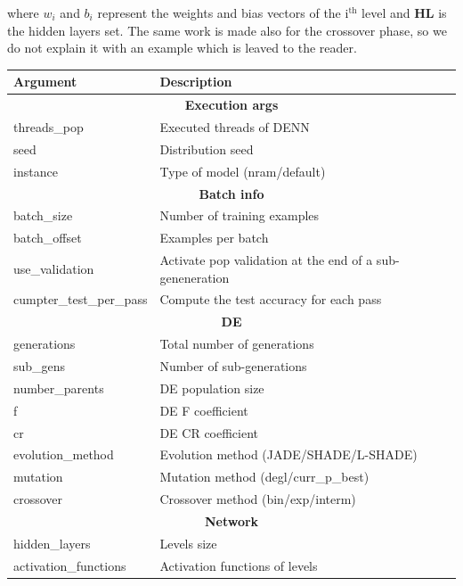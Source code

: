 where $w_i$ and $b_i$ represent the weights and bias vectors of the $\textrm{i}^{\textrm{th}}$ level and \textbf{HL} is the hidden layers set. The same work is made also for the crossover phase, so we do not explain it with an example which is leaved to the reader.

\begin{table}[]
	\centering
	\begin{tabular}{|l|l|}
		\hline
		Argument     & Description \\ \hline \hline

		\multicolumn{2}{|c|}{\textbf{Execution args}} \\ \hline
		threads\_pop & Executed threads of DENN \\ \hline
		seed     	 & Distribution seed \\ \hline
		instance		 & Type of model (nram/default) \\ \hline \hline

		\multicolumn{2}{|c|}{\textbf{Batch info}} \\ \hline
		batch\_size  	 & Number of training examples \\ \hline
		batch\_offset	 & Examples per batch \\ \hline
		use\_validation & Activate pop validation at the end of a sub-		geneneration \\ \hline
		cumpter\_test\_per\_pass     	 & Compute the test accuracy for each pass \\ \hline \hline

		\multicolumn{2}{|c|}{\textbf{DE}} \\ \hline
		generations  	 & Total number of generations \\ \hline
		sub\_gens  	 	& Number of sub-generations \\ \hline
		number\_parents  	 	& DE population size \\ \hline
		f						& DE F coefficient \\ \hline
		cr						& DE CR coefficient \\ \hline
		evolution\_method 		& Evolution method (JADE/SHADE/L-SHADE) \\ 	\hline
		mutation 				& Mutation method (degl/curr\_p\_best) \\ \hline
		crossover				& Crossover method (bin/exp/interm) \\ \hline

		\multicolumn{2}{|c|}{\textbf{Network}} \\ \hline
		hidden\_layers  	 		& Levels size \\ \hline
		activation\_functions  	& Activation functions of levels \\ \hline


\end{tabular}
\end{table}

